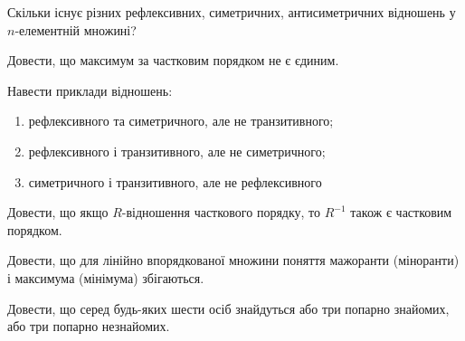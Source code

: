 \begin{problem}
	Скільки існує різних рефлексивних, симетричних, антисиметричних відношень у $n$-елементній множині?
\end{problem}

\begin{problem}
	Довести, що максимум за частковим порядком не є єдиним.
\end{problem}

\begin{problem}
	Навести приклади відношень:
	\begin{enumerate}
		\item рефлексивного та симетричного, але не транзитивного;
		\item рефлексивного і транзитивного, але не симетричного;
		\item симетричного і транзитивного, але не рефлексивного
	\end{enumerate}
\end{problem}

\begin{sproblem}
	Довести, що якщо $R$-відношення часткового порядку, то $R^{-1}$ також є частковим порядком.
\end{sproblem}

\begin{sproblem}
	Довести, що для лінійно впорядкованої множини поняття мажоранти (міноранти) і максимума (мінімума) збігаються.
\end{sproblem}

\begin{dproblem}
	Довести, що серед будь-яких шести осіб знайдуться або три попарно знайомих, або три попарно незнайомих.
\end{dproblem}

